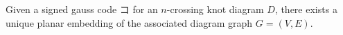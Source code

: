 
\begin{theorem}\label{thm:diagram-graph-unique-planar-embedding}
  Given a signed gauss code $コ$ for an $n$-crossing knot diagram $D$,
  there exists a unique planar embedding of the associated diagram
  graph $G = (V, E)$.
\end{theorem}
